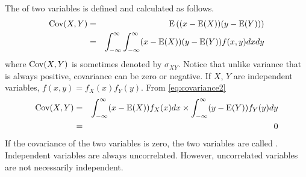 The  of two variables is defined and calculated as follows.
\begin{eqnarray}
	\textup{Cov}(X, Y) &=& \textup{E}\left((x - \textup{E}(X))(y - \textup{E}(Y))\right) \label{eq:covariance1} \\
	&=& \int_{-\infty}^{\infty}\int_{-\infty}^{\infty}(x - \textup{E}(X))(y - \textup{E}(Y))f(x, y)dxdy \label{eq:covariance2}
\end{eqnarray}
where $\textup{Cov}(X, Y)$ is sometimes denoted by $\sigma_{XY}$. Notice that unlike variance that is always positive, covariance can be zero or negative. If $X$, $Y$ are independent variables, $f(x,y) = f_X(x)f_Y(y)$. From \eqref{eq:covariance2}
\begin{eqnarray}
	\textup{Cov}(X, Y) &=& \int_{-\infty}^{\infty}(x - \textup{E}(X))f_X(x)dx \times \int_{-\infty}^{\infty}(y - \textup{E}(Y))f_Y(y)dy \nonumber \\
	&=& 0 \nonumber
\end{eqnarray}
If the covariance of the two variables is zero, the two variables are called . Independent variables are always uncorrelated. However, uncorrelated variables are not necessarily independent.


